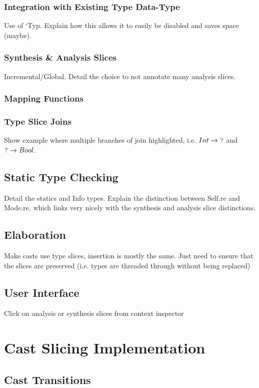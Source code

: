 \subsubsection{Integration with Existing Type Data-Type}
Use of `Typ. Explain how this allows it to easily be disabled and saves space (maybe).
\subsubsection{Synthesis \& Analysis Slices}
Incremental/Global. Detail the choice to not annotate many analysis slices.
\subsubsection{Mapping Functions}
\subsubsection{Type Slice Joins}
Show example where multiple branches of join highlighted, i.e. $Int \to {\color{teal}\texttt{?}}$ and ${\color{teal}\texttt{?}} \to Bool$.

\subsection{Static Type Checking}\label{sec:TypeChecking}
Detail the statics and Info types. Explain the distinction between Self.re and Mode.re, which links very nicely with the synthesis and analysis slice distinctions.

\subsection{Elaboration}\label{sec:Elaboration}
Make casts use type slices, insertion is mostly the same. Just need to ensure that the slices are preserved (i.e. types are threaded through without being replaced)

\subsection{User Interface}
Click on analysis or synthesis slices from context inspector

\section{Cast Slicing Implementation}\label{sec:CastSlicingImplementation}
\subsection{Cast Transitions}

